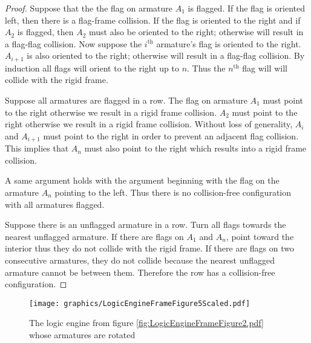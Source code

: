 \begin{proof}

Suppose that the the flag on armature $A_1$ is flagged.  If the flag is oriented left, then there 
is a flag-frame collision.  If the flag is oriented to the right and if $A_2$ is flagged, then 
$A_2$ must also be oriented to the right; otherwise will result in a flag-flag collision.  Now 
suppose the $i^\text{th}$ armature's flag is oriented to the right.  $A_{i+1}$ is also oriented to 
the right; otherwise will result in a flag-flag collision. By induction all flags will orient to 
the right up to $n$.  Thus the $n^\text{th}$ flag will will collide with the rigid frame.

Suppose all armatures are flagged in a row.  The flag on armature $A_1$ must point to the 
right otherwise we result in a rigid frame collision.  $A_2$ must point to the right otherwise 
we result in a rigid frame collision.  Without loss of generality, $A_i$ and $A_{i+1}$ must 
point to the right in order to prevent an adjacent flag collision.  This implies that $A_n$ 
must also point to the right which results into a rigid frame collision.

A same argument holds with the argument beginning with the flag 
on the armature $A_n$ pointing to the left.  Thus there is no collision-free configuration with 
all 
armatures flagged.


Suppose there is an unflagged armature in a row.  Turn all flags towards the nearest unflagged 
armature.  If there are flags on $A_1$ and $A_n$, point toward the interior thus they do not 
collide with the rigid frame.  If there are flags on two consecutive armatures, they do not collide 
because the nearest unflagged armature cannot be between them.  Therefore the row has a 
collision-free configuration.
\end{proof}

\begin{figure}[!h]
\begin{center}
\texttt{[image: graphics/LogicEngineFrameFigure5Scaled.pdf]}
\caption{The logic engine from figure \ref{fig:LogicEngineFrameFigure2.pdf} whose armatures are rotated}\label{fig:LogicEngineFrameFigure5.pdf}
\end{center}
\end{figure}


